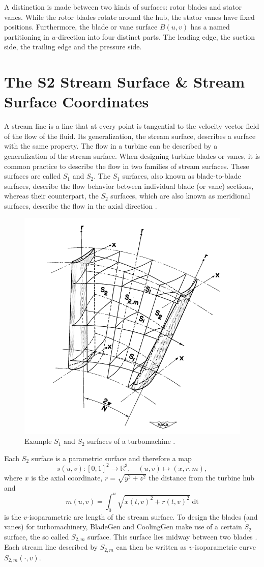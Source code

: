 \documentclass[a4paper, 11pt]{report}
\theoremstyle{definition}
\begin{document}
	A distinction is made between two kinds of surfaces: rotor blades and stator vanes. While the rotor blades rotate around the hub, the stator vanes have fixed positions. Furthermore, the blade or vane surface $B(u,v)$ has a named partitioning in $u$-direction into four distinct parts. The leading edge, the suction side, the trailing edge and the pressure side.

\section{The S2 Stream Surface \& Stream Surface Coordinates}\label{sec:mrtheta}
	A stream line is a line that at every point is tangential to the velocity vector field of the flow of the fluid. Its generalization, the stream surface, describes a surface with the same property. The flow in a turbine can be described by a generalization of the stream surface. When designing turbine blades or vanes, it is common practice to describe the flow in two families of stream surfaces. These surfaces are called $S_1$ and $S_2$. The $S_1$ surfaces, also known as blade-to-blade surfaces, describe the flow behavior between individual blade (or vane) sections, whereas their counterpart, the $S_2$ surfaces, which are also known as meridional surfaces, describe the flow in the axial direction \cite{Wu1952}.

	\begin{figure}[H]
		\centering
		\includegraphics[width=.5\textwidth]{../assets/renamed_wu_naca_s2.png}
		\caption{Example $S_1$ and $S_2$ surfaces of a turbomachine \cite{Wu1952}.}
	\end{figure}
	
	Each $S_2$ surface is a parametric surface and therefore a map
		$$s(u,v) : [0,1]^2 \rightarrow \mathbb{R}^3, \quad (u,v) \mapsto (x, r, m),$$
	where $x$ is the axial coordinate, $r = \sqrt{y^2+z^2}$ the distance from the turbine hub and 
		$$m(u,v) = \int_0^u \sqrt{x(t,v)^2 + r(t,v)^2} \; \textrm{dt}$$
	is the $v$-isoparametric arc length of the stream surface. To design the blades (and vanes) for turbomachinery, BladeGen and CoolingGen make use of a certain $S_2$ surface, the so called $S_{2,m}$ surface. This surface lies midway between two blades \cite{Wu1952}. Each stream line described by $S_{2,m}$ can then be written as $v$-isoparametric curve $S_{2,m}(\cdot, v)$.
\end{document}
